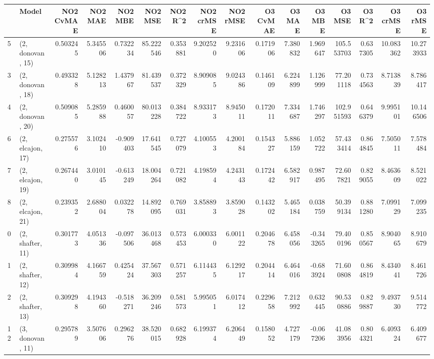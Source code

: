 \begin{tabular}{llrrrrrrrrrrrrrr}
\toprule
{} &             Model &  NO2 CvMAE &   NO2 MAE &   NO2 MBE &    NO2 MSE &   NO2 R\textasciicircum2 &  NO2 crMSE &  NO2 rMSE &  O3 CvMAE &    O3 MAE &    O3 MBE &      O3 MSE &    O3 R\textasciicircum2 &   O3 crMSE &    O3 rMSE \\
\midrule
5  &  (2, donovan, 15) &   0.503245 &  5.345506 &  0.732234 &  85.222546 &  0.353881 &   9.202520 &  9.231606 &  0.171906 &  7.380832 &  1.969647 &  105.553703 &  0.637305 &  10.083362 &  10.273933 \\
3  &  (2, donovan, 18) &   0.493328 &  5.128213 &  1.437967 &  81.439537 &  0.372329 &   8.909085 &  9.024386 &  0.146109 &  6.224899 &  1.126999 &   77.201118 &  0.734563 &   8.713839 &   8.786417 \\
4  &  (2, donovan, 20) &   0.509085 &  5.285988 &  0.460057 &  80.013228 &  0.384722 &   8.933173 &  8.945011 &  0.172011 &  7.334687 &  1.746297 &  102.951593 &  0.646379 &   9.995101 &  10.146506 \\
6  &  (2, elcajon, 17) &   0.275576 &  3.102410 & -0.909403 &  17.641545 &  0.727079 &   4.100553 &  4.200184 &  0.154327 &  5.886159 &  1.052722 &   57.433414 &  0.864845 &   7.505011 &   7.578484 \\
7  &  (2, elcajon, 19) &   0.267440 &  3.010145 & -0.613249 &  18.004264 &  0.721082 &   4.198594 &  4.243143 &  0.172442 &  6.582917 &  0.987495 &   72.607821 &  0.829055 &   8.463609 &   8.521022 \\
8  &  (2, elcajon, 21) &   0.239352 &  2.688004 &  0.032278 &  14.892095 &  0.769031 &   3.858893 &  3.859028 &  0.143202 &  5.465184 &  0.038759 &   50.399134 &  0.881280 &   7.099129 &   7.099235 \\
0  &  (2, shafter, 11) &   0.301773 &  4.051336 & -0.097506 &  36.013468 &  0.573453 &   6.000330 &  6.001122 &  0.204678 &  6.458056 & -0.343265 &   79.400196 &  0.850567 &   8.904065 &   8.910679 \\
1  &  (2, shafter, 12) &   0.309984 &  4.166759 &  0.425424 &  37.567303 &  0.571257 &   6.114435 &  6.129217 &  0.204414 &  6.464016 & -0.683924 &   71.600808 &  0.864819 &   8.434041 &   8.461726 \\
2  &  (2, shafter, 13) &   0.309298 &  4.194360 & -0.518271 &  36.209246 &  0.581573 &   5.995051 &  6.017412 &  0.229658 &  7.212992 &  0.632445 &   90.530886 &  0.829887 &   9.493730 &   9.514772 \\
12 &  (3, donovan, 11) &   0.295789 &  3.507606 &  0.296276 &  38.520015 &  0.682928 &   6.199374 &  6.206449 &  0.158052 &  4.727179 & -0.067206 &   41.083956 &  0.804321 &   6.409324 &   6.409677 \\

\end{tabular}
